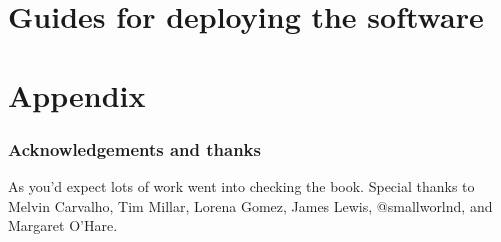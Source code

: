 \documentclass[
	12pt, %
	fleqn, %
	a4paper, %
	oneside, %
]{LegrandOrangeBook}
\begin{document}
\part{Guides for deploying the software}


\stopcontents[part] %

\part{Appendix}
\section{Acknowledgements and thanks}
As you'd expect lots of work went into checking the book. Special thanks to Melvin Carvalho, Tim Millar, Lorena Gomez, James Lewis, @smallworlnd, and Margaret O'Hare.
\end{document}
